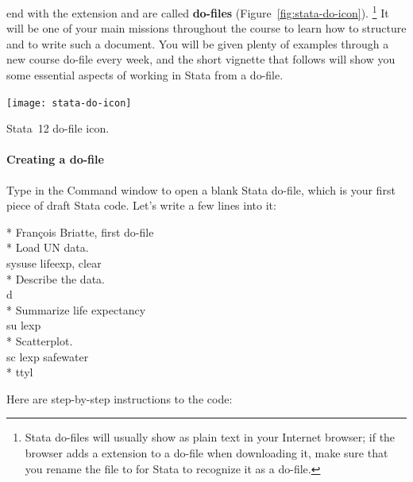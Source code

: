  end with the  extension and are called \textbf{do-files} (Figure~\ref{fig:stata-do-icon}).%
  \footnote{Stata do-files will usually show as plain text in your Internet browser; if the browser adds a  extension to a do-file when downloading it, make sure that you rename the file to  for Stata to recognize it as a do-file.} %
  It will be one of your main missions throughout the course to learn how to structure and to write such a document. You will be given plenty of examples through a new course do-file every week, and the short vignette that follows will show you some essential aspects of working in Stata from a do-file.%

\begin{marginfigure}
  \texttt{[image: stata-do-icon]}
  \caption{Stata~12 do-file icon.}
  \label{fig:stata-do-icon}
\end{marginfigure}

%
%
\paragraph{Creating a do-file}

Type  in the Command window to open a blank Stata do-file, which is your first piece of draft Stata code. Let's write a few lines into it:%

\begin{docspec}
  * François Briatte, first do-file\\[1em]%
  * Load UN data.\\%
  sysuse lifeexp, clear\\[1em]%
  * Describe the data.\\%
  d\\[1em]%
  * Summarize life expectancy\\%
  su lexp\\[1em]%
  * Scatterplot.\\%
  sc lexp safewater\\[1em]%
  * ttyl\\
\end{docspec}

Here are step-by-step instructions to the code:


